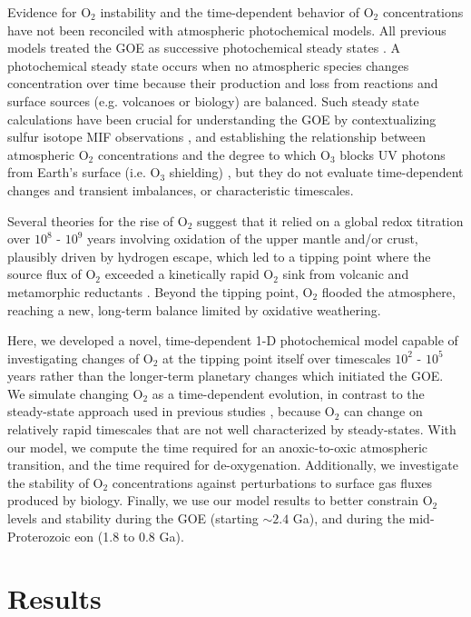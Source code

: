 Evidence for O$_2$ instability and the time-dependent behavior of O$_2$ concentrations have not been reconciled with atmospheric photochemical models. All previous models treated the GOE as successive photochemical steady states \citep{Kasting_1980,Segura_2003,Pavlov_2001,Pavlov_2002,Zahnle_2006,Bethan_2021,Claire_2014,Izon_2017,Kurzweil_2013}. A photochemical steady state occurs when no atmospheric species changes concentration over time because their production and loss from reactions and surface sources (e.g. volcanoes or biology) are balanced. Such steady state calculations have been crucial for understanding the GOE by contextualizing sulfur isotope MIF observations \citep{Pavlov_2002,Zahnle_2006}, and establishing the relationship between atmospheric O$_2$ concentrations and the degree to which O$_3$ blocks UV photons from Earth's surface (i.e. O$_3$ shielding) \citep{Kasting_1980,Pavlov_2001,Bethan_2021}, but they do not evaluate time-dependent changes and transient imbalances, or characteristic timescales.

Several theories for the rise of O$_2$ suggest that it relied on a global redox titration over $10^8$ - $10^9$ years involving oxidation of the upper mantle and/or crust, plausibly driven by hydrogen escape, which led to a tipping point where the source flux of O$_2$ exceeded a kinetically rapid O$_2$ sink from volcanic and metamorphic reductants \citep{Catling_2001,Claire_2006,Kadoya_2020,Holland_2002,Kasting_1993}. Beyond the tipping point, O$_2$ flooded the atmosphere, reaching a new, long-term balance limited by oxidative weathering. 

Here, we developed a novel, time-dependent 1-D photochemical model capable of investigating changes of O$_2$ at the tipping point itself over timescales $10^2$ - $10^5$ years rather than the longer-term planetary changes which initiated the GOE. We simulate changing O$_2$ as a time-dependent evolution, in contrast to the steady-state approach used in previous studies \citep[e.g.][]{Kasting_1980}, because O$_2$ can change on relatively rapid timescales that are not well characterized by steady-states. With our model, we compute the time required for an anoxic-to-oxic atmospheric transition, and the time required for de-oxygenation. Additionally, we investigate the stability of O$_2$ concentrations against perturbations to surface gas fluxes produced by biology. Finally, we use our model results to better constrain O$_2$ levels and stability during the GOE (starting $\sim 2.4$ Ga), and during the mid-Proterozoic eon (1.8 to 0.8 Ga).

\section{Results}